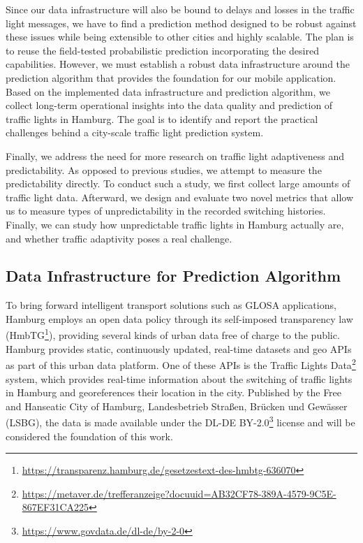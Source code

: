 Since our data infrastructure will also be bound to delays and losses in the traffic light messages, we have to find a prediction method designed to be robust against these issues while being extensible to other cities and highly scalable. The plan is to reuse the field-tested probabilistic prediction incorporating the desired capabilities. However, we must establish a robust data infrastructure around the prediction algorithm that provides the foundation for our mobile application. Based on the implemented data infrastructure and prediction algorithm, we collect long-term operational insights into the data quality and prediction of traffic lights in Hamburg. The goal is to identify and report the practical challenges behind a city-scale traffic light prediction system.

Finally, we address the need for more research on traffic light adaptiveness and predictability. As opposed to previous studies, we attempt to measure the predictability directly. To conduct such a study, we first collect large amounts of traffic light data. Afterward, we design and evaluate two novel metrics that allow us to measure types of unpredictability in the recorded switching histories. Finally, we can study how unpredictable traffic lights in Hamburg actually are, and whether traffic adaptivity poses a real challenge.

\subsection{Data Infrastructure for Prediction Algorithm}

To bring forward intelligent transport solutions such as GLOSA applications, Hamburg employs an open data policy through its self-imposed transparency law (HmbTG\footnote{\url{https://transparenz.hamburg.de/gesetzestext-des-hmbtg-636070}}), providing several kinds of urban data free of charge to the public. Hamburg provides static, continuously updated, real-time datasets and geo APIs as part of this urban data platform. One of these APIs is the Traffic Lights Data\footnote{\url{https://metaver.de/trefferanzeige?docuuid=AB32CF78-389A-4579-9C5E-867EF31CA225}} system, which provides real-time information about the switching of traffic lights in Hamburg and georeferences their location in the city. Published by the Free and Hanseatic City of Hamburg, Landesbetrieb Straßen, Brücken und Gewässer (LSBG), the data is made available under the DL-DE BY-2.0\footnote{\url{https://www.govdata.de/dl-de/by-2-0}} license and will be considered the foundation of this work.

